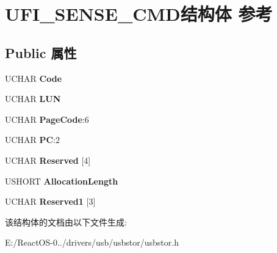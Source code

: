 \hypertarget{struct_u_f_i___s_e_n_s_e___c_m_d}{}\section{U\+F\+I\+\_\+\+S\+E\+N\+S\+E\+\_\+\+C\+M\+D结构体 参考}
\label{struct_u_f_i___s_e_n_s_e___c_m_d}
\subsection*{Public 属性}
\begin{DoxyCompactItemize}
\item 
\mbox{\label{struct_u_f_i___s_e_n_s_e___c_m_d_ae6f90088cd25175211e5abe83ad2e57c}} 
U\+C\+H\+AR {\bfseries Code}
\item 
\mbox{\label{struct_u_f_i___s_e_n_s_e___c_m_d_a457cd88913ed58f82484e5c930617ddd}} 
U\+C\+H\+AR {\bfseries L\+UN}
\item 
\mbox{\label{struct_u_f_i___s_e_n_s_e___c_m_d_a217523e12ea7b05157d649f91de3d89a}} 
U\+C\+H\+AR {\bfseries Page\+Code}\+:6
\item 
\mbox{\label{struct_u_f_i___s_e_n_s_e___c_m_d_a12f59ae869b8fefcc5b17fd3567508de}} 
U\+C\+H\+AR {\bfseries PC}\+:2
\item 
\mbox{\label{struct_u_f_i___s_e_n_s_e___c_m_d_aba92df2e0d580fac8cc1468620a56b86}} 
U\+C\+H\+AR {\bfseries Reserved} \mbox{[}4\mbox{]}
\item 
\mbox{\label{struct_u_f_i___s_e_n_s_e___c_m_d_a8654e733de26a44d9c2ca5074267ed18}} 
U\+S\+H\+O\+RT {\bfseries Allocation\+Length}
\item 
\mbox{\label{struct_u_f_i___s_e_n_s_e___c_m_d_aca41b57e51ba8c3244da5fe053adeac5}} 
U\+C\+H\+AR {\bfseries Reserved1} \mbox{[}3\mbox{]}
\end{DoxyCompactItemize}


该结构体的文档由以下文件生成\+:\begin{DoxyCompactItemize}
\item 
E\+:/\+React\+O\+S-\/0../drivers/usb/usbstor/usbstor.\+h\end{DoxyCompactItemize}
